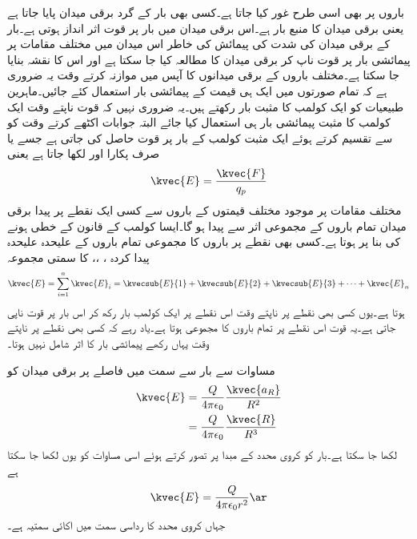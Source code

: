 باروں پر بھی اسی طرح غور کیا جاتا ہے۔کسی بھی بار  کے گرد برقی میدان پایا جاتا ہے یعنی برقی میدان کا منبع بار ہے۔اس برقی میدان میں بار پر قوت اثر انداز ہوتی ہے۔بار  کے برقی میدان کی شدت کی پیمائش کی خاطر اس میدان میں مختلف مقامات پر پیمائشی بار   پر قوت  ناپ کر برقی میدان کا مطالعہ کیا جا سکتا ہے اور اس کا نقشہ بنایا جا سکتا ہے۔مختلف باروں کے برقی میدانوں کا آپس میں موازنہ کرتے وقت یہ ضروری ہے کہ تمام صورتوں میں ایک ہی قیمت کے پیمائشی بار  استعمال کئے جائیں۔ماہرین طبیعیات  کو ایک کولمب کا مثبت بار  رکھتے ہیں۔یہ ضروری نہیں کہ قوت ناپتے وقت ایک کولمب کا مثبت پیمائشی بار ہی استعمال کیا جائے البتہ جوابات اکٹھے کرتے وقت  کو  سے تقسیم کرتے ہوئے ایک مثبت کولمب کے بار پر قوت حاصل کی جاتی ہے جسے  یا صرف  پکارا اور  لکھا جاتا ہے یعنی
\begin{align}\label{مساوات_کولمب_برقی_شدت_اور_قوت}
\kvec{E}=\frac{\kvec{F}}{q_p}
\end{align}
مختلف مقامات پر موجود مختلف قیمتوں کے باروں سے کسی ایک نقطے پر  پیدا برقی میدان  تمام باروں کے مجموعی اثر سے پیدا ہو گا۔ایسا کولمب کے قانون کے خطی ہونے کی بنا پر ہوتا ہے۔کسی بھی نقطے پر  باروں کا مجموعی  تمام باروں کے علیحدہ علیحدہ پیدا کردہ  ،  ،،  کا سمتی مجموعہ
\begin{align}
\kvec{E}=\sum_{i=1}^n \kvec{E}_i=\kvecsub{E}{1}+\kvecsub{E}{2}+\kvecsub{E}{3}+\cdots+\kvec{E}_n 
\end{align}
 ہوتا ہے۔یوں کسی بھی نقطے   پر  ناپتے وقت اس نقطے پر ایک کولمب بار  رکھ کر اس بار پر قوت ناپی جاتی ہے۔یہ قوت اس نقطے پر تمام باروں کا مجموعی   ہوتا ہے۔یاد رہے کہ کسی بھی نقطے پر   ناپتے وقت یہاں رکھے پیمائشی بار  کا اثر شامل نہیں ہوتا۔

مساوات   سے  بار  سے  سمت میں  فاصلے پر برقی میدان کو
\begin{gather}
\begin{aligned}\label{مساوات_کولمب_قوت_کی_عمومی_مساوات}
\kvec{E}&=\frac{Q}{4 \pi \epsilon_0}\frac{\kvec{a_{R}}}{ R^2}\\
&=\frac{Q}{4 \pi \epsilon_0}\frac{\kvec{R}}{ R^3}
\end{aligned}
\end{gather}
لکھا جا سکتا ہے۔بار کو کروی محدد کے مبدا پر تصور کرتے ہوئے اسی مساوات کو یوں لکھا جا سکتا ہے
\begin{align}\label{مساوات_کولمب_نقطہ_بار_کروی_رداس_پر_تبدیل_نہیں_ہوتا}
\kvec{E}=\frac{Q}{4 \pi \epsilon_0 r^2} \ar
\end{align}
جہاں    کروی محدد کا رداسی سمت میں اکائی سمتیہ ہے۔

